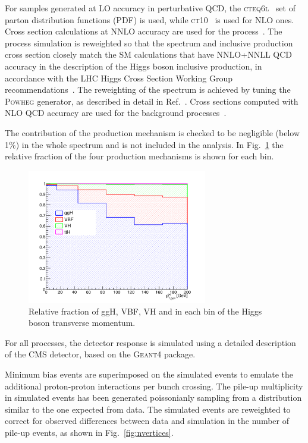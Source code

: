 For samples generated at LO accuracy in perturbative QCD, the \textsc{cteq6l}~\cite{Lai:2010nw} set of parton distribution functions
(PDF) is used, while \textsc{ct10}~\cite{Lai:2010vv} is used for NLO ones.
Cross section calculations at NNLO accuracy are used for the \hww process~\cite{Dittmaier:2011ti}.
The \hww process simulation is reweighted so that the \pth spectrum and inclusive production cross section closely match the SM calculations that have NNLO+NNLL QCD accuracy in the description of the Higgs boson inclusive production, in accordance with the LHC Higgs Cross Section Working Group recommendations~\cite{Heinemeyer:2013tqa}.
The reweighting of the \pth spectrum is achieved by tuning the \textsc{Powheg} generator, as described in detail in Ref.~\cite{Alioli:2010xd}.
Cross sections computed with NLO QCD accuracy are used for the background processes~\cite{Heinemeyer:2013tqa}.

The contribution of the \ttH production mechanism is checked to be negligible (below 1\%) in the whole \pth spectrum and is not included in the analysis. In Fig.~\ref{fig:signal_comp} the relative fraction of the four production mechanisms is shown for each \pth bin.

\begin{figure}[htb]
\centering
\includegraphics[width=0.7\textwidth]{images/signal_composition_ttH.pdf}
\caption{Relative fraction of ggH, VBF, VH and \ttH in each bin of the Higgs boson transverse momentum.}\label{fig:signal_comp}
\end{figure}

For all processes, the detector response is simulated using a detailed description of the CMS detector, based on the \textsc{Geant4} package.

Minimum bias events are superimposed on the simulated events to emulate the additional 
proton-proton interactions per bunch crossing. The pile-up multiplicity in simulated events has been generated poissonianly sampling from a distribution similar to the one expected from data.
The simulated events are reweighted to correct for observed differences between data and simulation in the number of pile-up events, as shown in Fig.~\ref{fig:nvertices}.

